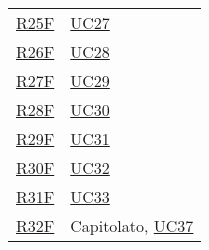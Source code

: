 \begin{center}
\begin{longtable}[!h]{p{50px} p{50px}}
        \hyperref[tab:RequisitiFunzionali]{R25F}   & \hyperref[sec:UC27]{UC27}                      \\
        \hyperref[tab:RequisitiFunzionali]{R26F}   & \hyperref[sec:UC28]{UC28}                      \\
        \hyperref[tab:RequisitiFunzionali]{R27F}   & \hyperref[sec:UC29]{UC29}                      \\
        \hyperref[tab:RequisitiFunzionali]{R28F}   & \hyperref[sec:UC30]{UC30}                      \\
        \hyperref[tab:RequisitiFunzionali]{R29F}   & \hyperref[sec:UC31]{UC31}                      \\
        \hyperref[tab:RequisitiFunzionali]{R30F}   & \hyperref[sec:UC32]{UC32}                      \\
        \hyperref[tab:RequisitiFunzionali]{R31F}   & \hyperref[sec:UC33]{UC33}                      \\
        \hyperref[tab:RequisitiFunzionali]{R32F}   & Capitolato, \hyperref[sec:UC37]{UC37}          \\





\end{longtable}
\end{center}
